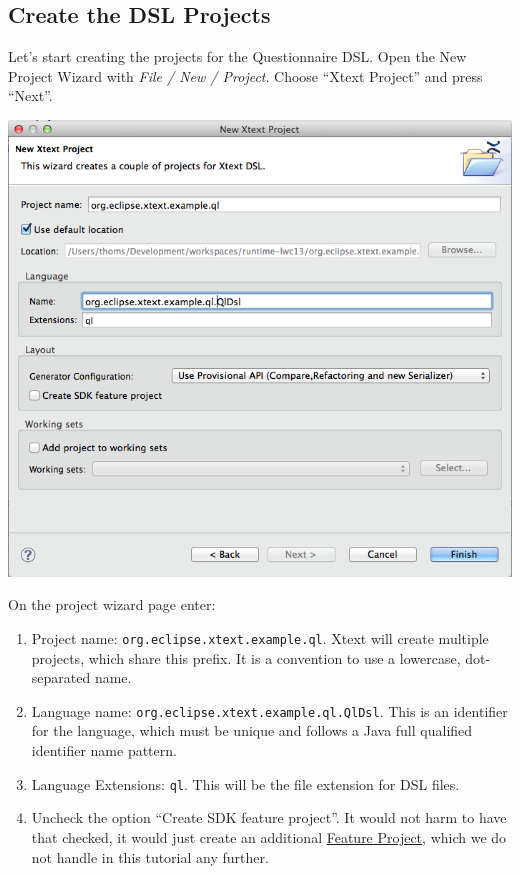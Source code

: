 \subsection{Create the DSL Projects}

Let's start creating the projects for the Questionnaire DSL. Open the New
Project Wizard with \emph{File / New / Project}. Choose ``Xtext Project'' and press
``Next''.

\includegraphics[width=17cm]{./images/chapter01/NewXtextProjectWizard.png}

On the project wizard page enter:
\begin{enumerate}
  \item Project name: \texttt{org.eclipse.xtext.example.ql}. Xtext will create
  multiple projects, which share this prefix. It is a convention to use
  a lowercase, dot-separated name.
  \item Language name: \texttt{org.eclipse.xtext.example.ql.QlDsl}. This is an
  identifier for the language, which must be unique and follows a Java
  full qualified identifier name pattern.
  \item Language Extensions: \texttt{ql}. This will be the file extension for
  DSL files.
  \item Uncheck the option ``Create SDK feature project''. It would not harm to
  have that checked, it would just create an additional
  \href{http://www.vogella.com/articles/EclipseFeatureProject/article.html}{Feature
  Project}, which we do not handle in this tutorial any further.
\end{enumerate}


